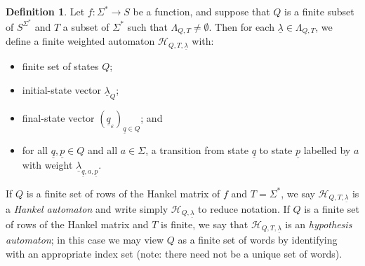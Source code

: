 \documentclass[10pt,a4paper]{amsart}
\theoremstyle{definition}
\newtheorem{defi}[thm]{Definition}
\numberwithin{equation}{section}
\numberwithin{theorem}{section}
\begin{document}
\begin{defi}
\label{definition:hankel}
Let $f: \Sigma^* \rightarrow S$ be a function, and suppose that $Q$ is a finite subset of $S^{\Sigma^*}$ and $T$ a subset of $\Sigma^*$ such that $\Lambda_{Q, T} \neq \emptyset$. Then for each $\underline{\lambda} \in \Lambda_{Q, T}$, we define a finite weighted automaton $\mathcal{H}_{Q, T, \underline{\lambda}}$ with:
\begin{itemize}
\item finite set of states $Q$;
\item initial-state vector $\underline{\lambda}_Q$;
\item final-state vector $(\underline{q} _\varepsilon)_{\underline{q} \in Q}$; and
\item for all $\underline{q},\underline{p} \in Q$ and all $a \in \Sigma$, a transition from state $\underline{q}$ to state $\underline{p}$ labelled by $a$ with weight $\underline{\lambda}_{\underline{q},a,\underline{p}}$.
\end{itemize}
If $Q$ is a finite set of rows of the Hankel matrix of $f$ and $T = \Sigma^*$,  we say $\mathcal{H}_{Q, T, \underline{\lambda}}$ is a \emph{Hankel automaton} and write simply $\mathcal{H}_{Q, \underline{\lambda}}$ to reduce notation. If $Q$ is a finite set of rows of the Hankel matrix and $T$ is finite, we say that $\mathcal{H}_{Q, T, \underline{\lambda}}$ is an \emph{hypothesis automaton}; in this case we may view $Q$ as a finite set of words by identifying with an appropriate index set (note: there need not be a unique set of words).\end{defi} 
\end{document}
